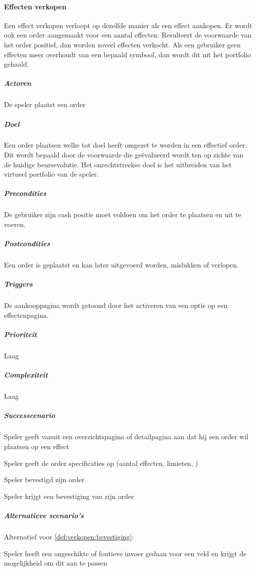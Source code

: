 \paragraph{Effecten verkopen}
\begin{compact}
Een effect verkopen verloopt op dezelfde manier als een effect aankopen. Er wordt ook een order aangemaakt voor een aantal effecten. Resulteert de voorwaarde van het order positief, dan worden zoveel effecten verkocht. Als een gebruiker geen effecten meer overhoudt van een bepaald symbool, dan wordt dit uit het portfolio gehaald.
\subparagraph{Actoren} De speler plaatst een order
\subparagraph{Doel} Een order plaatsen welke tot doel heeft omgezet te worden in een effectief order. Dit wordt bepaald door de voorwaarde die ge\"evalueerd wordt ten op zichte van de huidige beursevolutie. Het onrechtstreekse doel is het uitbreiden van het virtueel portfolio van de speler.
\subparagraph{Precondities} De gebruiker zijn cash positie moet voldoen om het order te plaatsen en uit te voeren.
\subparagraph{Postcondities} Een order is geplaatst en kan later uitgevoerd worden, mislukken of verlopen.
\subparagraph{Triggers} De aankooppagina wordt getoond door het activeren van een optie op een effectenpagina.
\subparagraph{Prioriteit}Laag
\subparagraph{Complexiteit}Laag
\subparagraph{Successcenario}
\begin{enumerate_compact}
 \item Speler geeft vanuit een overzichtspagina of detailpagina aan dat hij een order wil plaatsen op een effect
 \item Speler geeft de order specificaties op (aantal effecten, limieten, )
 \item Speler bevestigd zijn order
 \item \label{def:verkopen:bevestiging} Speler krijgt een bevestiging van zijn order
\end{enumerate_compact}
\subparagraph{Alternatieve scenario's}
Alternatief voor \ref{def:verkopen:bevestiging}:
\begin{enumerate_compact}
 \item Speler heeft een ongeschikte of foutieve invoer gedaan voor een veld en krijgt de mogelijkheid om dit aan te passen
\end{enumerate_compact}
\end{compact}

